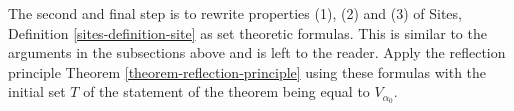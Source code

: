 \medskip\noindent
The second and final step is to rewrite
properties (1), (2) and (3) of Sites,
Definition \ref{sites-definition-site} as set theoretic formulas.
This is similar to the arguments in the subsections above and is
left to the reader. Apply the reflection
principle Theorem \ref{theorem-reflection-principle} using these formulas
with the initial set $T$ of the statement of the theorem being equal to
$V_{\alpha_0}$.









